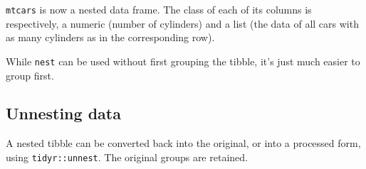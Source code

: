 \documentclass[]{book}
\newenvironment{Shaded}{}{}
\newcommand{\CommentTok}[1]{\textcolor[rgb]{0.38,0.63,0.69}{\textit{#1}}}
\newcommand{\DataTypeTok}[1]{\textcolor[rgb]{0.56,0.13,0.00}{#1}}
\newcommand{\KeywordTok}[1]{\textcolor[rgb]{0.00,0.44,0.13}{\textbf{#1}}}
\newcommand{\NormalTok}[1]{#1}
\newcommand{\OperatorTok}[1]{\textcolor[rgb]{0.40,0.40,0.40}{#1}}
\newcommand{\StringTok}[1]{\textcolor[rgb]{0.25,0.44,0.63}{#1}}
\begin{document}
\begin{Shaded}
\end{Shaded}

\texttt{mtcars} is now a nested data frame. The class of each of its columns is respectively, a numeric (number of cylinders) and a list (the data of all cars with as many cylinders as in the corresponding row).

While \texttt{nest} can be used without first grouping the tibble, it's just much easier to group first.

\hypertarget{unnesting-data}{%
\subsection{Unnesting data}\label{unnesting-data}}

A nested tibble can be converted back into the original, or into a processed form, using \texttt{tidyr::unnest}. The original groups are retained.
\end{document}
